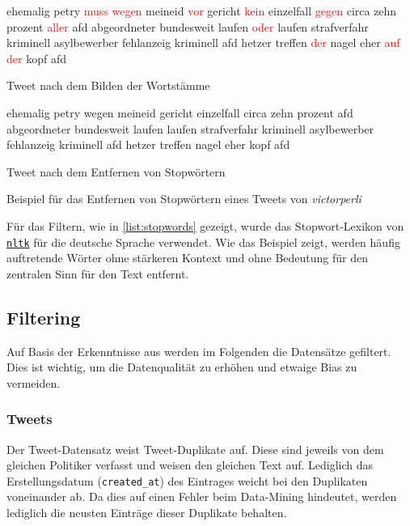 \begin{code}[H]
    \begin{subcode}{0.45\textwidth}
        \small
        ehemalig petry \textcolor{red}{muss wegen} meineid \textcolor{red}{vor} gericht \textcolor{red}{kein} einzelfall \textcolor{red}{gegen} circa zehn prozent \textcolor{red}{aller} afd abgeordneter bundesweit laufen \textcolor{red}{oder} laufen strafverfahr kriminell asylbewerber fehlanzeig kriminell afd hetzer treffen \textcolor{red}{der} nagel eher \textcolor{red}{auf der} kopf afd
        \caption{Tweet nach dem Bilden der Wortstämme}
    \end{subcode}\hfill
    \begin{subcode}{0.45\textwidth}
        \small
        ehemalig petry wegen meineid gericht einzelfall circa zehn prozent afd abgeordneter bundesweit laufen laufen strafverfahr kriminell asylbewerber fehlanzeig kriminell afd hetzer treffen nagel eher kopf afd
        \caption{Tweet nach dem Entfernen von Stopwörtern}
    \end{subcode}\hfill
    \caption[Beispiel -- Entfernen von Stopwörtern]{Beispiel für das Entfernen von Stopwörtern eines Tweets von \textit{victorperli}} \label{list:stopwords}
\end{code}

Für das Filtern, wie in \autoref{list:stopwords} gezeigt, wurde das Stopwort-Lexikon von \href{https://www.nltk.org/}{\texttt{nltk}} für die deutsche Sprache verwendet. Wie das Beispiel zeigt, werden häufig auftretende Wörter ohne stärkeren Kontext und ohne Bedeutung für den zentralen Sinn für den Text entfernt.

\subsection{Filtering} \label{subsec:filtering}

Auf Basis der Erkenntnisse aus  werden im Folgenden die Datensätze gefiltert. Dies ist wichtig, um die Datenqualität zu erhöhen und etwaige Bias zu vermeiden.

\subsubsection*{Tweets} \label{subsubsec:filteringTweets}


Der Tweet-Datensatz \textcite{saltzer_finding_2022} weist Tweet-Duplikate auf. Diese sind jeweils von dem gleichen Politiker verfasst und weisen den gleichen Text auf. Lediglich das Erstellungsdatum (\texttt{created\_at}) des Eintrages weicht bei den Duplikaten voneinander ab. Da dies auf einen Fehler beim Data-Mining hindeutet, werden lediglich die neusten Einträge dieser Duplikate behalten.

